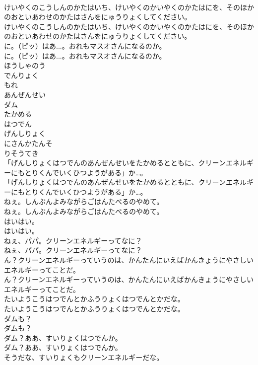 \documentclass[8pt]{extreport}
\begin{document}
\begin{CJK}{UTF8}{min}
\\	けいやくのこうしんのかたはいち、けいやくのかいやくのかたはにを、そのほかのおといあわせのかたはさんをにゅうりょくしてください。
\\	けいやくのこうしんのかたはいち、けいやくのかいやくのかたはにを、そのほかのおといあわせのかたはさんをにゅうりょくしてください。
\\	に。（ピッ）はあ...。おれもマスオさんになるのか。
\\	に。（ピッ）はあ...。おれもマスオさんになるのか。
\\	ほうしゃのう
\\	でんりょく
\\	もれ
\\	あんぜんせい
\\	ダム
\\	たかめる
\\	はつでん
\\	げんしりょく
\\	にさんかたんそ
\\	りそうてき
\\	「げんしりょくはつでんのあんぜんせいをたかめるとともに、クリーンエネルギーにもとりくんでいくひつようがある」か…。
\\	「げんしりょくはつでんのあんぜんせいをたかめるとともに、クリーンエネルギーにもとりくんでいくひつようがある」か…。
\\	ねぇ。しんぶんよみながらごはんたべるのやめて。
\\	ねぇ。しんぶんよみながらごはんたべるのやめて。
\\	はいはい。
\\	はいはい。
\\	ねぇ、パパ。クリーンエネルギーってなに？
\\	ねぇ、パパ。クリーンエネルギーってなに？
\\	ん？クリーンエネルギーっていうのは、かんたんにいえばかんきょうにやさしいエネルギーってことだ。
\\	ん？クリーンエネルギーっていうのは、かんたんにいえばかんきょうにやさしいエネルギーってことだ。
\\	たいようこうはつでんとかふうりょくはつでんとかだな。
\\	たいようこうはつでんとかふうりょくはつでんとかだな。
\\	ダムも？
\\	ダムも？
\\	ダム？ああ、すいりょくはつでんか。
\\	ダム？ああ、すいりょくはつでんか。
\\	そうだな、すいりょくもクリーンエネルギーだな。

\end{CJK}
\end{document}
